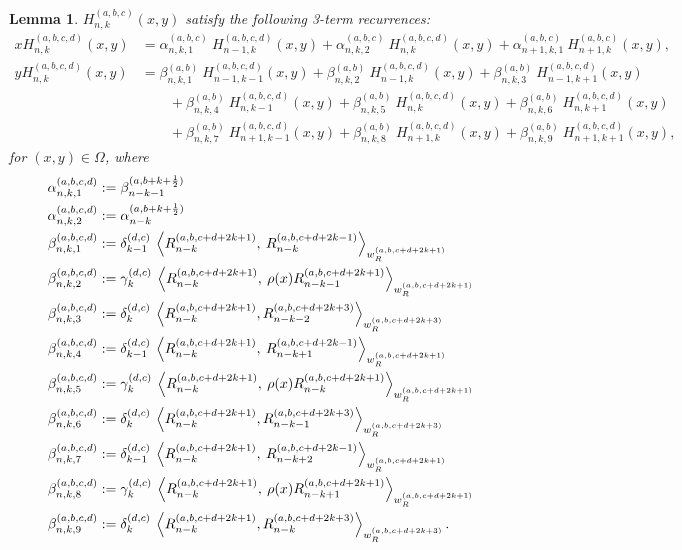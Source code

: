 \documentclass[11pt, oneside]{article}   	%
\newcommand{\half}{\frac{1}{2}}
\newcommand{\hdop}{H}
\newcommand{\betaab}{\beta^{(a,b)}}
\newcommand{\genjac}{R}
\newcommand{\genjacnmk}{\genjac_{n-k}}
\newcommand{\genjacw}{w_\genjac}
\newcommand{\hdopnkabc}{\hdop_{n,k}^{(a,b,c)}}
\newcommand{\alphaabc}{\alpha^{(a,b,c)}}
\newcommand{\alphaabcd}{\alpha^{(a,b,c,d)}}
\newcommand{\betaabcd}{\beta^{(a,b,c,d)}}
\newcommand{\hdopnkabcd}{\hdop_{n,k}^{(a,b,c,d)}}
\newtheorem{lemma}{Lemma}
\begin{document}
\begin{lemma}
$\hdopnkabc(x,y)$ satisfy the following 3-term recurrences:
\begin{align*}
x \hdopnkabcd(x,y) &= \alphaabc_{n,k,1} \: \hdop_{n-1, k}^{(a,b,c,d)}(x, y) + \alphaabc_{n,k,2} \: \hdop_{n, k}^{(a,b,c,d)}(x, y) + \alphaabc_{n+1,k,1} \: \hdop_{n+1, k}^{(a,b,c)}(x, y), \\
y \hdopnkabcd(x,y) &= \betaab_{n,k,1} \: \hdop_{n-1, k-1}^{(a,b,c,d)}(x, y) + \betaab_{n,k,2} \: \hdop_{n-1, k}^{(a,b,c,d)}(x, y) + \betaab_{n,k,3} \: \hdop_{n-1, k+1}^{(a,b,c,d)}(x, y) \nonumber \\
		& \quad \quad + \betaab_{n,k,4} \: \hdop_{n, k-1}^{(a,b,c,d)}(x, y) + \betaab_{n,k,5} \: \hdop_{n, k}^{(a,b,c,d)}(x, y) + \betaab_{n,k,6} \: \hdop_{n, k+1}^{(a,b,c,d)}(x, y) \nonumber \\
		& \quad \quad + \betaab_{n,k,7} \: \hdop_{n+1, k-1}^{(a,b,c,d)}(x, y) + \betaab_{n,k,8} \: \hdop_{n+1, k}^{(a,b,c,d)}(x, y) + \betaab_{n,k,9} \: \hdop_{n+1, k+1}^{(a,b,c,d)}(x, y),
\end{align*}
for \((x,y) \in \Omega\), where
\begin{align*}
	\alphaabcd_{n,k,1} &:= \beta_{n-k-1}^{(a, b+k+\half)} \\
	\alphaabcd_{n,k,2} &:= \alpha_{n-k}^{(a, b+k+\half)} \\
	\betaabcd_{n,k,1} &:= \delta_{k-1}^{(d,c)} \: \ip<\genjacnmk^{(a, b, c+d+2k+1)}, \: \genjacnmk^{(a, b, c+d+2k-1)}>_{\genjacw^{(a, b, c+d+2k+1)}} \\
	\betaabcd_{n,k,2} &:= \gamma_k^{(d,c)} \: \ip<\genjacnmk^{(a, b, c+d+2k+1)}, \: \rho(x) \genjac_{n-k-1}^{(a, b, c+d+2k+1)}>_{\genjacw^{(a, b, c+d+2k+1)}} \\
	\betaabcd_{n,k,3} &:= \delta_{k}^{(d,c)} \: \ip<\genjacnmk^{(a, b, c+d+2k+1)}, \genjac_{n-k-2}^{(a, b, c+d+2k+3)}>_{\genjacw^{(a, b, c+d+2k+3)}} \\
	\betaabcd_{n,k,4} &:= \delta_{k-1}^{(d,c)} \: \ip<\genjacnmk^{(a, b, c+d+2k+1)}, \: \genjac_{n-k+1}^{(a, b, c+d+2k-1)}>_{\genjacw^{(a, b, c+d+2k+1)}} \\
	\betaabcd_{n,k,5} &:= \gamma_k^{(d,c)} \: \ip<\genjacnmk^{(a, b, c+d+2k+1)}, \: \rho(x) \genjac_{n-k}^{(a, b, c+d+2k+1)}>_{\genjacw^{(a, b, c+d+2k+1)}} \\
	\betaabcd_{n,k,6} &:= \delta_{k}^{(d,c)} \: \ip<\genjacnmk^{(a, b, c+d+2k+1)}, \genjac_{n-k-1}^{(a, b, c+d+2k+3)}>_{\genjacw^{(a, b, c+d+2k+3)}} \\
	\betaabcd_{n,k,7} &:= \delta_{k-1}^{(d,c)} \: \ip<\genjacnmk^{(a, b, c+d+2k+1)}, \: \genjac_{n-k+2}^{(a, b, c+d+2k-1)}>_{\genjacw^{(a, b, c+d+2k+1)}} \\
	\betaabcd_{n,k,8} &:= \gamma_k^{(d,c)} \: \ip<\genjacnmk^{(a, b, c+d+2k+1)}, \: \rho(x) \genjac_{n-k+1}^{(a, b, c+d+2k+1)}>_{\genjacw^{(a, b, c+d+2k+1)}} \\
	\betaabcd_{n,k,9} &:= \delta_{k}^{(d,c)} \: \ip<\genjacnmk^{(a, b, c+d+2k+1)}, \genjacnmk^{(a, b, c+d+2k+3)}>_{\genjacw^{(a, b, c+d+2k+3)}}. 
\end{align*}

\end{lemma}
\end{document}
